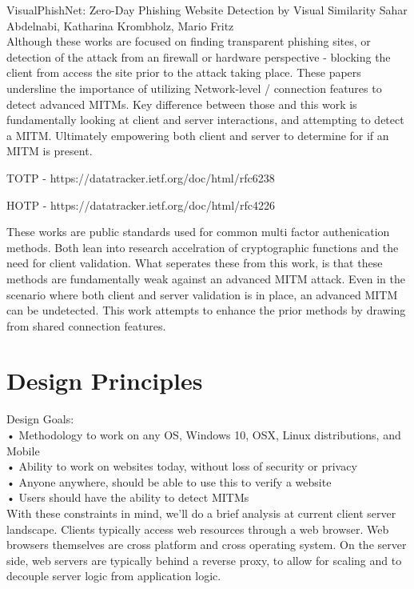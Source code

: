 \documentclass[a4paper, 11pt]{article} 				%
\begin{document}
\noindent
[19]VisualPhishNet: Zero-Day Phishing Website Detection by Visual Similarity
Sahar Abdelnabi, Katharina Krombholz, Mario Fritz\\

Although these works are focused on finding transparent phishing sites, or detection of the attack from an firewall or hardware perspective - blocking the client from access the site prior to the attack taking place. These papers undersline the importance of utilizing Network-level / connection features to detect advanced MITMs. Key difference between those and this work is fundamentally looking at client and server interactions, and attempting to detect a MITM. Ultimately empowering both client and server to determine for if an MITM is present. 

\noindent
[7]TOTP - https://datatracker.ietf.org/doc/html/rfc6238

\noindent
[8]HOTP - https://datatracker.ietf.org/doc/html/rfc4226 

These works are public standards used for common multi factor authenication methods. Both lean into research accelration of cryptographic functions and the need for client validation. What seperates these from this work, is that these methods are fundamentally weak against an advanced MITM attack. Even in the scenario where both client and server validation is in place, an advanced MITM can be undetected. This work attempts to enhance the prior methods by drawing from shared connection features.

\section{Design Principles}
\noindent	%
Design Goals:\\
• Methodology to work on any OS, Windows 10, OSX, Linux distributions, and Mobile\\
• Ability to work on websites today, without loss of security or privacy\\
• Anyone anywhere, should be able to use this to verify a website\\
• Users should have the ability to detect MITMs\\

With these constraints in mind, we'll do a brief analysis at current client server landscape. Clients typically access web resources through a web browser. Web browsers themselves are cross platform and cross operating system. On the server side, web servers are typically behind a reverse proxy, to allow for scaling and to decouple server logic from application logic. 
\end{document}
